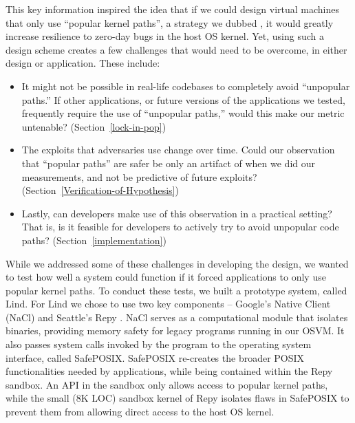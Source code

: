 This key information inspired the idea that if we could design virtual machines that only use ``popular kernel paths'', a strategy we dubbed \lip, 
it would greatly increase resilience to zero-day bugs in the host OS kernel. 
Yet, using such a design scheme creates a few challenges that would need to be overcome, in either design or application. These include: 

\begin{itemize}
\item It might not be possible in real-life codebases to completely avoid ``unpopular paths.''  
If other applications, or future versions of the applications we tested, frequently require the use of ``unpopular paths,'' would this make our metric untenable? 
(Section~{\ref{lock-in-pop}})
\item The exploits that adversaries use change over time. Could our observation that ``popular paths'' are safer be only an artifact of when we did our measurements, 
and not be predictive of future exploits? (Section~{\ref{Verification-of-Hypothesis}}) 
\item Lastly, can developers make use of this observation in a practical setting? That is, is it feasible for developers to actively try to avoid unpopular code paths? 
(Section~{\ref{implementation}})
\end{itemize}

While we addressed some of these challenges in developing the \lip design, 
we wanted to test how well a system could function if it forced applications to only use popular kernel paths. 
To conduct these tests, we built a prototype system, called Lind. 
For Lind we chose to use two key components -- Google's Native Client
(NaCl) \cite{NaCl-09} and Seattle's Repy \cite{Repy-10}. 
NaCl serves as a computational module that isolates
binaries, providing memory safety for legacy programs running in our OSVM.
It also passes system calls invoked by the program to the operating system interface, called SafePOSIX.
SafePOSIX re-creates the broader POSIX functionalities needed by applications, while being contained within the Repy sandbox. 
An API in the sandbox only allows access to popular kernel paths, while
the small (8K LOC) sandbox kernel of Repy isolates flaws in SafePOSIX
to prevent them from allowing direct access to the host OS kernel.

